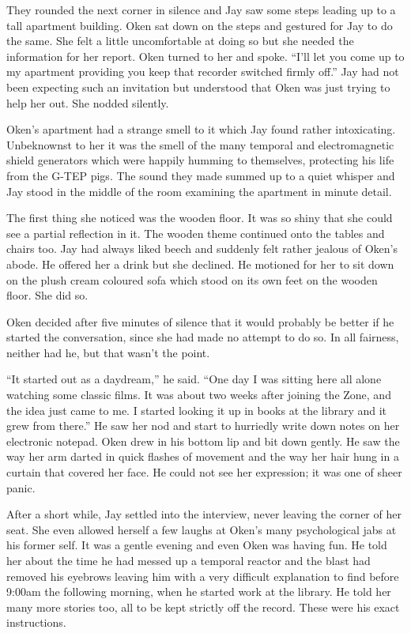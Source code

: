 They rounded the next corner in silence and Jay saw some steps leading up to a tall apartment building.  Oken sat down on the steps and gestured for Jay to do the same.  She felt a little uncomfortable at doing so but she needed the information for her report.  Oken turned to her and spoke.  ``I'll let you come up to my apartment providing you keep that recorder switched firmly off.''  Jay had not been expecting such an invitation but understood that Oken was just trying to help her out.  She nodded silently.



\thoughtbreak



Oken's apartment had a strange smell to it which Jay found rather intoxicating.  Unbeknownst to her it was the smell of the many temporal and electromagnetic shield generators which were happily humming to themselves, protecting his life from the G-TEP pigs.  The sound they made summed up to a quiet whisper and Jay stood in the middle of the room examining the apartment in minute detail.

The first thing she noticed was the wooden floor.  It was so shiny that she could see a partial reflection in it.  The wooden theme continued onto the tables and chairs too.  Jay had always liked beech and suddenly felt rather jealous of Oken's abode.  He offered her a drink but she declined.  He motioned for her to sit down on the plush cream coloured sofa which stood on its own feet on the wooden floor.  She did so.

Oken decided after five minutes of silence that it would probably be better if he started the conversation, since she had made no attempt to do so.  In all fairness, neither had he, but that wasn't the point.

``It started out as a daydream,'' he said.  ``One day I was sitting here all alone watching some classic films. It was about two weeks after joining the Zone, and the idea just came to me.  I started looking it up in books at the library and it grew from there.''  He saw her nod and start to hurriedly write down notes on her electronic notepad.  Oken drew in his bottom lip and bit down gently.  He saw the way her arm darted in quick flashes of movement and the way her hair hung in a curtain that covered her face.  He could not see her expression; it was one of sheer panic.

After a short while, Jay settled into the interview, never leaving the corner of her seat.   She even allowed herself a few laughs at Oken's many psychological jabs at his former self.  It was a gentle evening and even Oken was having fun.  He told her about the time he had messed up a temporal reactor and the blast had removed his eyebrows leaving him with a very difficult explanation to find before 9:00am the following morning, when he started work at the library.  He told her many more stories too, all to be kept strictly off the record.    These were his exact instructions.  

